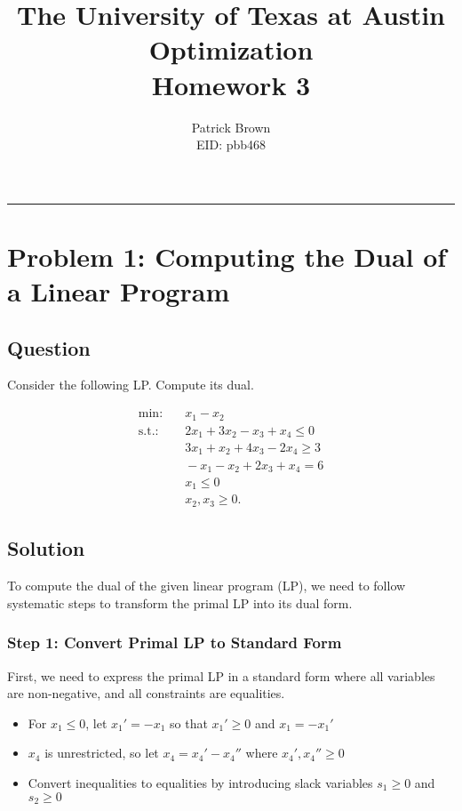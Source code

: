 \documentclass[12pt,letterpaper]{article}
\title{The University of Texas at Austin\\
\large Optimization\\
\large Homework 3}
\author{Patrick Brown\\
EID: pbb468}
\date{}
\begin{document}
\maketitle

\hrule

\section{Problem 1: Computing the Dual of a Linear Program}

\subsection{Question}
Consider the following LP. Compute its dual.

\begin{align*}
\text{min} : &\quad x_1 - x_2 \\
\text{s.t.} : &\quad 2x_1 + 3x_2 - x_3 + x_4 \leq 0 \\
              &\quad 3x_1 + x_2 + 4x_3 - 2x_4 \geq 3 \\
              &\quad -x_1 - x_2 + 2x_3 + x_4 = 6 \\
              &\quad x_1 \leq 0 \\
              &\quad x_2, x_3 \geq 0.
\end{align*}

\subsection{Solution}

To compute the dual of the given linear program (LP), we need to follow systematic steps to transform the primal LP into its dual form.

\subsubsection{Step 1: Convert Primal LP to Standard Form}

First, we need to express the primal LP in a standard form where all variables are non-negative, and all constraints are equalities.

\begin{itemize}
    \item For $x_1 \leq 0$, let $x_1' = -x_1$ so that $x_1' \geq 0$ and $x_1 = -x_1'$
    \item $x_4$ is unrestricted, so let $x_4 = x_4' - x_4''$ where $x_4', x_4'' \geq 0$
    \item Convert inequalities to equalities by introducing slack variables $s_1 \geq 0$ and $s_2 \geq 0$
\end{itemize}
\end{document}
